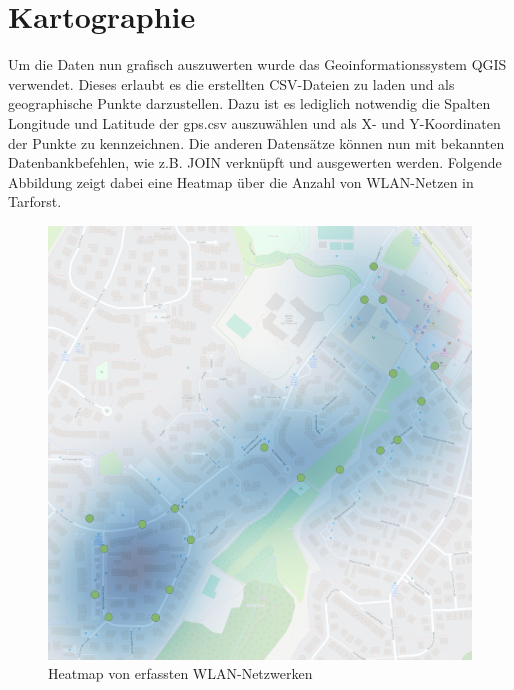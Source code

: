 \documentclass[a4paper,11pt, ngerman]{scrartcl}
\begin{document}
\section{Kartographie}
Um die Daten nun grafisch auszuwerten wurde das Geoinformationssystem \grqq QGIS\grqq{} verwendet. Dieses erlaubt es die erstellten CSV-Dateien zu laden und als geographische Punkte darzustellen. Dazu ist es lediglich notwendig die Spalten \grqq Longitude\grqq{} und \grqq Latitude\grqq{} der gps.csv auszuwählen und als X- und Y-Koordinaten der Punkte zu kennzeichnen. Die anderen Datensätze können nun mit bekannten Datenbankbefehlen, wie z.B. JOIN verknüpft und ausgewerten werden. Folgende Abbildung zeigt dabei eine Heatmap über die Anzahl von WLAN-Netzen in Tarforst.

\begin{figure}[H]
\begin{center}
	\includegraphics[width=.7\linewidth]{map.png}\caption{Heatmap von erfassten WLAN-Netzwerken}
	\end{center}
	\vspace{-20pt}
\end{figure}
\end{document}
